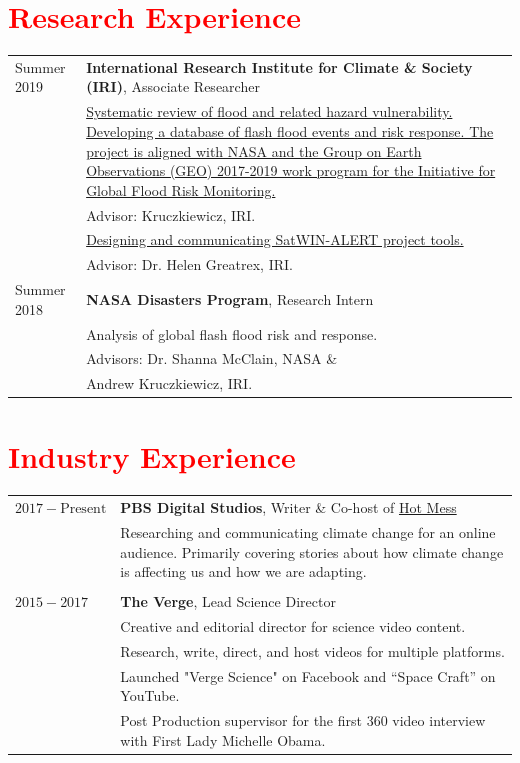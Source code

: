 \documentclass[margin, line, palatino, courier, 10pt]{res}
\begin{document}
\begin{resume}
\section{\sc \textcolor{Red}{\large{Research Experience}}}
\vspace*{0.05in}
\begin{tabular}{@{}p{1 in}p{4in}}
Summer 2019  & \textbf{International Research Institute for Climate \& Society (IRI)}, Associate Researcher\\
& \href{GEO}{Systematic review of flood and related hazard vulnerability.  Developing a database of flash flood events and risk response. The project is aligned with NASA and the Group on Earth Observations (GEO) 2017-2019 work program for the Initiative for Global Flood Risk Monitoring.} \\
& \hspace{0.2in} Advisor: Kruczkiewicz, IRI.\\
& \href{SatWIN}{Designing and communicating SatWIN-ALERT project tools.} \\
& \hspace{0.2in} Advisor: Dr. Helen Greatrex, IRI. \ 
\\
Summer 2018 & \textbf{NASA Disasters Program}, Research Intern  \\
& Analysis of global flash flood risk and response.  \\
& \hspace{0.2in} Advisors:  Dr. Shanna McClain, NASA \& \\
& \hspace{.82in} Andrew Kruczkiewicz, IRI. \\

\end{tabular}

\section{\sc \textcolor{Red}{\large{Industry Experience}}}
\vspace*{0.05in}
\begin{tabular}{@{}p{1 in}p{4in}}
$2017 - \text{Present}$  & \textbf{PBS Digital Studios}, Writer \& Co-host of \href{HM}{Hot Mess}\\
& Researching and communicating climate change for an online audience. Primarily covering stories about how climate change is affecting us and how we are adapting.\\
\\
$2015 - 2017$ & \textbf{The Verge}, Lead Science Director  \\
& Creative and editorial director for science video content. \\
& Research, write, direct, and host videos for multiple platforms. \\
& Launched "Verge Science" on Facebook and “Space Craft” on YouTube. \\
& Post Production supervisor for the first 360 video interview with First Lady Michelle Obama. \\


\end{tabular}
\end{resume}
\end{document}
